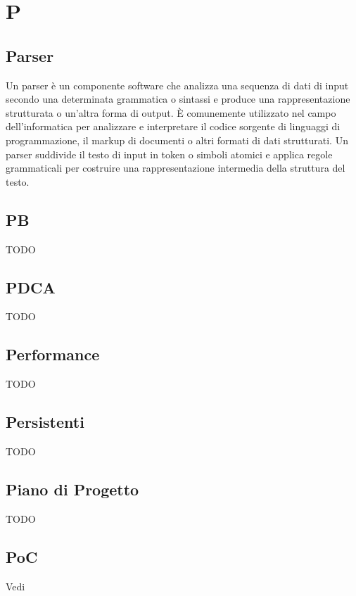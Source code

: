 \section{P}

\vspace{2em}
\subsection*{Parser}
Un parser è un componente software che analizza una sequenza di dati di input secondo una determinata grammatica o sintassi e produce una rappresentazione strutturata o un'altra forma di output. È comunemente utilizzato nel campo dell'informatica per analizzare e interpretare il codice sorgente di linguaggi di programmazione, il markup di documenti o altri formati di dati strutturati. Un parser suddivide il testo di input in token o simboli atomici e applica regole grammaticali per costruire una rappresentazione intermedia della struttura del testo.

\vspace{2em}
\subsection*{PB}
TODO

\vspace{2em}
\subsection*{PDCA}
TODO

\vspace{2em}
\subsection*{Performance}
TODO

\vspace{2em}
\subsection*{Persistenti}
TODO

\vspace{2em}
\subsection*{Piano di Progetto}
TODO

\vspace{2em}
\subsection*{PoC}
\par Vedi 

